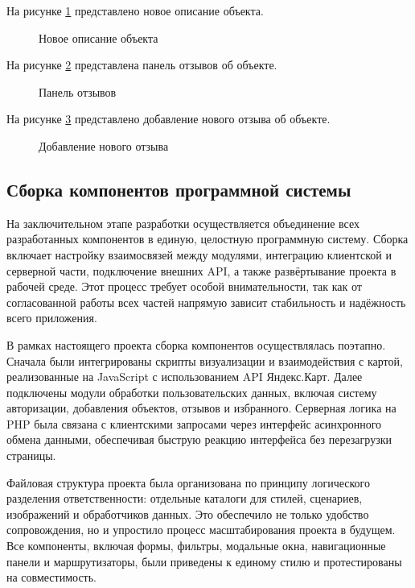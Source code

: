 \newpage
На рисунке \ref{r18:image} представлено новое описание объекта.

\begin{figure}[H]
	\center{\texttt{[image: r18]}}
	\caption{Новое описание объекта}
	\label{r18:image}
\end{figure}

\newpage
На рисунке \ref{r19:image} представлена панель отзывов об объекте.

\begin{figure}[H]
	\center{\texttt{[image: r19]}}
	\caption{Панель отзывов}
	\label{r19:image}
\end{figure}

\newpage
На рисунке \ref{r20:image} представлено добавление нового отзыва об объекте.

\begin{figure}[H]
	\center{\texttt{[image: r20]}}
	\caption{Добавление нового отзыва}
	\label{r20:image}
\end{figure}

\subsection{Сборка компонентов программной системы}

На заключительном этапе разработки осуществляется объединение всех разработанных компонентов в единую, целостную программную систему. Сборка включает настройку взаимосвязей между модулями, интеграцию клиентской и серверной части, подключение внешних API, а также развёртывание проекта в рабочей среде. Этот процесс требует особой внимательности, так как от согласованной работы всех частей напрямую зависит стабильность и надёжность всего приложения\cite{b29}.

В рамках настоящего проекта сборка компонентов осуществлялась поэтапно. Сначала были интегрированы скрипты визуализации и взаимодействия с картой, реализованные на JavaScript с использованием API Яндекс.Карт. Далее подключены модули обработки пользовательских данных, включая систему авторизации, добавления объектов, отзывов и избранного. Серверная логика на PHP была связана с клиентскими запросами через интерфейс асинхронного обмена данными, обеспечивая быструю реакцию интерфейса без перезагрузки страницы.

Файловая структура проекта была организована по принципу логического разделения ответственности: отдельные каталоги для стилей, сценариев, изображений и обработчиков данных. Это обеспечило не только удобство сопровождения, но и упростило процесс масштабирования проекта в будущем. Все компоненты, включая формы, фильтры, модальные окна, навигационные панели и маршрутизаторы, были приведены к единому стилю и протестированы на совместимость.

